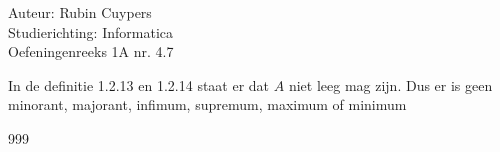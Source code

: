 \documentclass[a4paper]{article}
\begin{document}
  
\noindent \large Auteur: Rubin Cuypers \\
\noindent \large Studierichting:  Informatica\\
\noindent \large Oefeningenreeks 1A nr. 4.7\\

\medskip

\normalsize

In de definitie 1.2.13 en 1.2.14 staat er dat $A$ niet leeg mag zijn. Dus er is geen minorant, majorant, infimum, supremum, maximum of minimum

\begin{thebibliography}{999}
\end{thebibliography}
\end{document}
